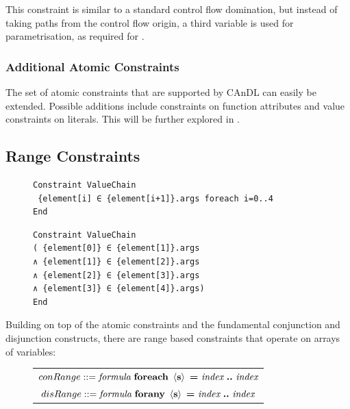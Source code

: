     \noindent
    This constraint is similar to a standard control flow domination, but
    instead of taking paths from the control flow origin, a third variable is
    used for parametrisation, as required for .

\subsubsection{Additional Atomic Constraints}

    The set of atomic constraints that are supported by CAnDL can easily be
    extended.
    Possible additions include constraints on function attributes and value
    constraints on literals.
    This will be further explored in .

\subsection{Range Constraints}

\begin{figure}[t]
\begin{lstlisting}[language=CAnDL]
Constraint ValueChain
 {element[i] ∈ {element[i+1]}.args foreach i=0..4
End
\end{lstlisting}
\begin{lstlisting}[language=CAnDL,label={fig:forall},caption=
   {Example for the expansion of range constraints in CAnDL:
    The specification at the top can be ``unrolled'' manually, resulting in the
    equivalent, but more verbose, specification below.}]
Constraint ValueChain
( {element[0]} ∈ {element[1]}.args
∧ {element[1]} ∈ {element[2]}.args
∧ {element[2]} ∈ {element[3]}.args
∧ {element[3]} ∈ {element[4]}.args)
End
\end{lstlisting}
\end{figure}

    Building on top of the atomic constraints and the fundamental conjunction
    and disjunction constructs, there are range based constraints that operate
    on arrays of variables:
\begin{figure}[h]
  \centering
  \begin{tabular}{|c|}
    \hline
    $conRange ::= \text{\it formula}\ \text{\bf foreach}\ \left<\text{\bf s}\right>\ \text{\bf =}\ \text{\it index}\ \text{\bf ..}\ \text{\it index}$\\
    $disRange ::= \text{\it formula}\ \text{\bf forany}\ \left<\text{\bf s}\right>\ \text{\bf =}\ \text{\it index}\ \text{\bf ..}\ \text{\it index}$\\
    \hline
  \end{tabular}
\end{figure}

